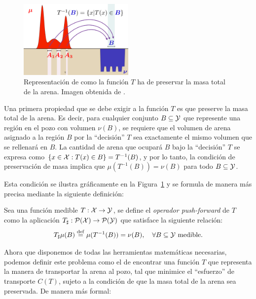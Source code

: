 {{{			\begin{figure}[ht]
				\centering
				\includegraphics[width=0.5\textwidth]{img/transporte/preservacion-masa.png}
				\caption{Representación de como la función $T$ ha de preservar la masa total de la arena. Imagen obtenida de \cite{cuturi2017primer}.}
				\label{fig:preservacion-masa}
			\end{figure}

			Una primera propiedad que se debe exigir a la función $T$ es que preserve la masa total de la arena. Es decir, para cualquier conjunto $B \subseteq \cY$ que represente una región en el pozo con volumen $\nu(B)$, se requiere que el volumen de arena asignado a la región $B$ por la ``decisión'' $T$ sea exactamente el mismo volumen que se rellenará en $B$. La cantidad de arena que ocupará $B$ bajo la ``decisión'' $T$ se expresa como $\left\{ x \in \cX : T(x) \in B \right\} = T^{-1}(B)$, y por lo tanto, la condición de preservación de masa implica que $\mu(T^{-1}(B)) = \nu(B)$ para todo $B \subseteq \cY$.

			Esta condición se ilustra gráficamente en la Figura~\ref{fig:preservacion-masa} y se formula de manera más precisa mediante la siguiente definición:

			\begin{definition}
				Sea una función medible $T:\cX \to \cY$, se define el \emph{operador push-forward}  de $T$ como la aplicación $\Tpf:\ProbSpace[\cX] \to \ProbSpace[\cY]$ que satisface la siguiente relación:
				\begin{equation}
					\label{eq:pushForward}
					\Tpf \mu(B) \eqdef \mu (T^{-1}(B)) = \nu(B),\quad \forall B \subseteq \cY \text{ medible}.
				\end{equation}
			\end{definition}

			Ahora que disponemos de todas las herramientas matemáticas necesarias, podemos definir este problema como el de encontrar una función $T$ que representa la manera de transportar la arena al pozo, tal que minimice el ``esfuerzo'' de transporte $C(T)$, sujeto a la condición de que la masa total de la arena sea preservada. De manera más formal:

}}}
